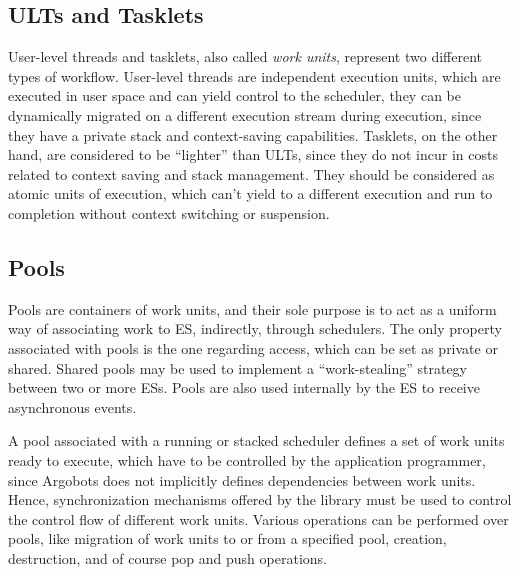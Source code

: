 \subsection{ULTs and Tasklets}
User-level threads and tasklets, also called \textit{work units}, represent two different types of workflow. User-level threads are independent execution units, which are executed in user space and can yield control to the scheduler, they can be dynamically migrated on a different execution stream during execution, since they have a private stack and context-saving capabilities. Tasklets, on the other hand, are considered to be ``lighter'' than ULTs, since they do not incur in costs related to context saving and stack management. They should be considered as atomic units of execution, which can't yield to a different execution and run to completion without context switching or suspension. 

\subsection{Pools}
Pools are containers of work units, and their sole purpose is to act as a uniform way of associating work to ES, indirectly, through schedulers. The only property associated with pools is the one regarding access, which can be set as private or shared. Shared pools may be used to implement a ``work-stealing'' strategy between two or more ESs. Pools are also used internally by the ES to receive asynchronous events.\newline

A pool associated with a running or stacked scheduler defines a set of work units ready to execute, which have to be controlled by the application programmer, since Argobots does not implicitly defines dependencies between work units. Hence, synchronization mechanisms offered by the library must be used to control the control flow of different work units.  Various operations can be performed over pools, like migration of work units to or from a specified pool, creation, destruction, and of course pop and push operations.

